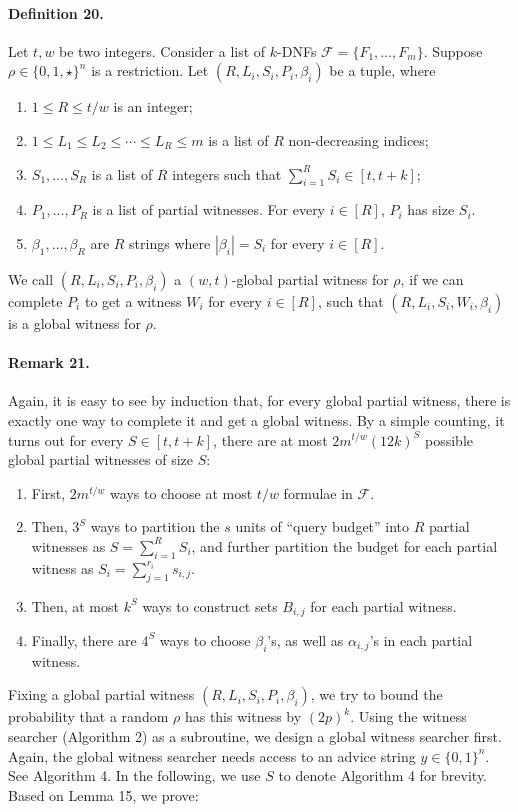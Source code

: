 \paragraph{Definition 20.} Let $t,w$ be two integers. Consider a list of $k$-DNFs $\mathcal F=\{F_1,\ldots,F_m\}$. Suppose $\rho\in\{0,1,\star\}^n$ is a restriction. Let $(R,L_i,S_i,P_i,\beta_i)$ be a tuple, where
\begin{enumerate}\item $1\le R\le t/w$ is an integer;
\item $1\le L_1\le L_2\le\cdots\le L_R\le m$ is a list of $R$ non-decreasing indices;
\item $S_1,\ldots,S_R$ is a list of $R$ integers such that $\sum_{i=1}^RS_i\in[t,t+k]$;
\item $P_1,\ldots,P_R$ is a list of partial witnesses. For every $i\in[R]$, $P_i$ has size $S_i$.
\item $\beta_1,\ldots,\beta_R$ are $R$ strings where $|\beta_i|=S_i$ for every $i\in[R]$.\end{enumerate}
We call $(R,L_i,S_i,P_i,\beta_i)$ a $(w,t)$-global partial witness for $\rho$, if we can complete $P_i$ to get a witness $W_i$ for every $i\in[R]$, such that $(R,L_i,S_i,W_i,\beta_i)$ is a global witness for $\rho$.
\paragraph{Remark 21.} Again, it is easy to see by induction that, for every global partial witness, there is exactly one way to complete it and get a global witness. By a simple counting, it turns out for every $S\in[t,t+k]$, there are at most $2m^{t/w}(12k)^S$ possible global partial witnesses of size $S$:
\begin{enumerate}\item First, $2m^{t/w}$ ways to choose at most $t/w$ formulae in $\mathcal F$.
\item Then, $3^S$ ways to partition the $s$ units of ``query budget'' into $R$ partial witnesses as $S=\sum_{i=1}^RS_i$, and further partition the budget for each partial witness as $S_i=\sum_{j=1}^{r_i}s_{i,j}$.
\item Then, at most $k^S$ ways to construct sets $B_{i,j}$ for each partial witness.
\item Finally, there are $4^S$ ways to choose $\beta_i$'s, as well as $\alpha_{i,j}$'s in each partial witness.\end{enumerate}
Fixing a global partial witness $(R,L_i,S_i,P_i,\beta_i)$, we try to bound the probability that a random $\rho$ has this witness by $(2p)^k$. Using the witness searcher (Algorithm 2) as a subroutine, we design a global witness searcher first. Again, the global witness searcher needs access to an advice string $y\in\{0,1\}^n$. See Algorithm 4. In the following, we use $S$ to denote Algorithm 4 for brevity. Based on Lemma 15, we prove:
